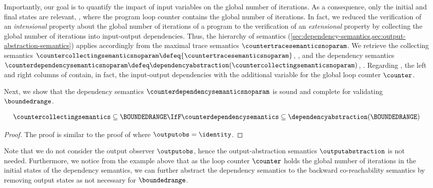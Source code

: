 Importantly, our goal is to quantify the impact of input variables on the global number of iterations.
As a consequence, only the initial and final states are relevant, \ie, where the program loop counter contains the global number of iterations.
In fact, we reduced the verification of an \emph{intensional} property about the global number of iterations of a program to the verification of an \emph{extensional} property by collecting the global number of iterations into input-output dependencies.
Thus, the hierarchy of semantics (\cref{sec:dependency-semantics,sec:output-abstraction-semantics}) applies accordingly from the maximal trace semantics $\countertracesemanticsnoparam$.
We retrieve the collecting semantics $\countercollectingsemanticsnoparam \defeq \{ \countertracesemanticsnoparam \}$, \cf{} , and the dependency semantics $\counterdependencysemanticsnoparam \defeq \dependencyabstraction(\countercollectingsemanticsnoparam)$, \cf{} .
Regarding , the left and right columns of  contain, in fact, the input-output dependencies with the additional variable for the global loop counter $\counter$.


Next, we show that the dependency semantics $\counterdependencysemanticsnoparam$ is sound and complete for validating $\boundedrange$.
\begin{lemma}
  \begin{align*}
    \countercollectingsemantics \subseteq \BOUNDEDRANGE \IfF \counterdependencysemantics \subseteq \dependencyabstraction(\BOUNDEDRANGE)
  \end{align*}
\end{lemma}
\begin{proof}
  The proof is similar to the proof of  where $\outputobs = \identity$.
\end{proof}

Note that we do not consider the output observer $\outputobs$, hence the output-abstraction semantics $\outputabstraction$ is not needed.
Furthermore, we notice from the example above that as the loop counter $\counter$ holds the global number of iterations in the initial states of the dependency semantics, we can further abstract the dependency semantics to the backward co-reachability semantics by removing output states as not necessary for $\boundedrange$.


